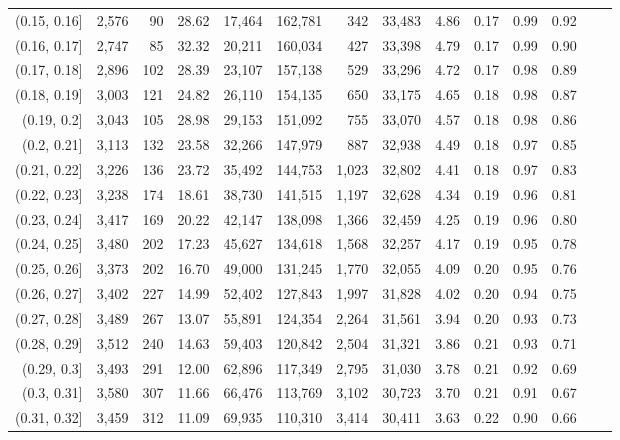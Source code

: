 \begin{tabular}{rrrrrrrrrrrrrr}
(0.15, 0.16]   &  2,576 &   90 &   28.62 &   17,464 &  162,781 &     342 &  33,483 &  4.86 &  0.17 &  0.99 &      0.92 \\
(0.16, 0.17]   &  2,747 &   85 &   32.32 &   20,211 &  160,034 &     427 &  33,398 &  4.79 &  0.17 &  0.99 &      0.90 \\
(0.17, 0.18]   &  2,896 &  102 &   28.39 &   23,107 &  157,138 &     529 &  33,296 &  4.72 &  0.17 &  0.98 &      0.89 \\
(0.18, 0.19]   &  3,003 &  121 &   24.82 &   26,110 &  154,135 &     650 &  33,175 &  4.65 &  0.18 &  0.98 &      0.87 \\
(0.19, 0.2]    &  3,043 &  105 &   28.98 &   29,153 &  151,092 &     755 &  33,070 &  4.57 &  0.18 &  0.98 &      0.86 \\
(0.2, 0.21]    &  3,113 &  132 &   23.58 &   32,266 &  147,979 &     887 &  32,938 &  4.49 &  0.18 &  0.97 &      0.85 \\
(0.21, 0.22]   &  3,226 &  136 &   23.72 &   35,492 &  144,753 &   1,023 &  32,802 &  4.41 &  0.18 &  0.97 &      0.83 \\
(0.22, 0.23]   &  3,238 &  174 &   18.61 &   38,730 &  141,515 &   1,197 &  32,628 &  4.34 &  0.19 &  0.96 &      0.81 \\
(0.23, 0.24]   &  3,417 &  169 &   20.22 &   42,147 &  138,098 &   1,366 &  32,459 &  4.25 &  0.19 &  0.96 &      0.80 \\
(0.24, 0.25]   &  3,480 &  202 &   17.23 &   45,627 &  134,618 &   1,568 &  32,257 &  4.17 &  0.19 &  0.95 &      0.78 \\
(0.25, 0.26]   &  3,373 &  202 &   16.70 &   49,000 &  131,245 &   1,770 &  32,055 &  4.09 &  0.20 &  0.95 &      0.76 \\
(0.26, 0.27]   &  3,402 &  227 &   14.99 &   52,402 &  127,843 &   1,997 &  31,828 &  4.02 &  0.20 &  0.94 &      0.75 \\
(0.27, 0.28]   &  3,489 &  267 &   13.07 &   55,891 &  124,354 &   2,264 &  31,561 &  3.94 &  0.20 &  0.93 &      0.73 \\
(0.28, 0.29]   &  3,512 &  240 &   14.63 &   59,403 &  120,842 &   2,504 &  31,321 &  3.86 &  0.21 &  0.93 &      0.71 \\
(0.29, 0.3]    &  3,493 &  291 &   12.00 &   62,896 &  117,349 &   2,795 &  31,030 &  3.78 &  0.21 &  0.92 &      0.69 \\
(0.3, 0.31]    &  3,580 &  307 &   11.66 &   66,476 &  113,769 &   3,102 &  30,723 &  3.70 &  0.21 &  0.91 &      0.67 \\
(0.31, 0.32]   &  3,459 &  312 &   11.09 &   69,935 &  110,310 &   3,414 &  30,411 &  3.63 &  0.22 &  0.90 &      0.66 \\

\end{tabular}
